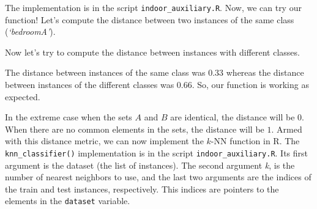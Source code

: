 \documentclass[
  11pt,
]{krantz}
\newenvironment{Shaded}{\begin{snugshade}}{\end{snugshade}}
\newcommand{\CommentTok}[1]{\textcolor[rgb]{0.37,0.37,0.37}{\textit{#1}}}
\newcommand{\DecValTok}[1]{\textcolor[rgb]{0.06,0.06,0.06}{#1}}
\newcommand{\FunctionTok}[1]{\textcolor[rgb]{0,0,0}{#1}}
\newcommand{\NormalTok}[1]{#1}
\newcommand{\SpecialCharTok}[1]{\textcolor[rgb]{0,0,0}{#1}}
\begin{document}
The implementation is in the script \texttt{indoor\_auxiliary.R}. Now, we can try our function! Let's compute the distance between two instances of the same class (\emph{`bedroomA'}).

\begin{Shaded}
\end{Shaded}

Now let's try to compute the distance between instances with different classes.

\begin{Shaded}
\end{Shaded}

The distance between instances of the same class was \(0.33\) whereas the distance between instances of the different classes was \(0.66\). So, our function is working as expected.

In the extreme case when the sets \(A\) and \(B\) are identical, the distance will be \(0\). When there are no common elements in the sets, the distance will be \(1\). Armed with this distance metric, we can now implement the \(k\)-NN function in R. The \texttt{knn\_classifier()} implementation is in the script \texttt{indoor\_auxiliary.R}. Its first argument is the dataset (the list of instances). The second argument \emph{k}, is the number of nearest neighbors to use, and the last two arguments are the indices of the train and test instances, respectively. This indices are pointers to the elements in the \texttt{dataset} variable.
\end{document}
